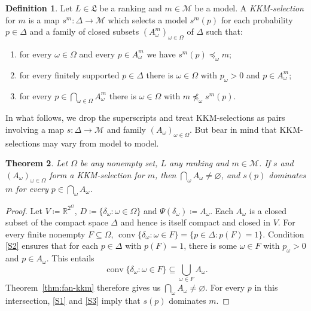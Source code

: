 \documentclass[11pt]{article}
\newcommand{\chg}[1]{{\color{red}#1}}
\newtheorem{theorem}{Theorem}[section]
\theoremstyle{definition}
\newtheorem{definition}[theorem]{Definition}
\theoremstyle{remark}
\newcommand{\M}{\mathcal M}
\begin{document}
\begin{definition}\label{def:selection}\label{def:selection-data}
Let $L\in\mathfrak L$ be a ranking and $m\in\M$ be a model. A \textit{KKM-selection} for $m$ is a map $s^m:\Delta\to\M$ which selects a model $s^m(p)$ for each probability $p\in\Delta$ and a family of closed subsets $(A^m_\omega)_{\omega\in\Omega}$ of $\Delta$ such that:
\begin{enumerate}[label=(S\arabic*),leftmargin=3em]
\item\label{S1} for every $\omega\in\Omega$ and every $p\in A^m_\omega$ we have $s^m(p)\preceq_\omega m$;
\item\label{S2} for every finitely supported $p\in\Delta$ there is $\omega\in\Omega$ with $p_\omega>0$ and $p\in A^m_\omega$;
\item\label{S3} for every $p\in\bigcap_{\omega\in\Omega}A^m_\omega$ there is $\omega\in\Omega$ with $m\not\preceq_\omega s^m(p)$.
\end{enumerate}
\end{definition}

In what follows, we drop the superscripts and treat KKM-selections as pairs involving a map $s:\Delta\to\M$ and family $(A_\omega)_{\omega\in\Omega}$. But bear in mind that KKM-selections may vary from model to model. 


\begin{theorem}\label{thm:selection}
Let $\Omega$ be any nonempty set, $L$ any ranking and $m\in\M$. If $s$ and $(A_\omega)_{\omega\in\Omega}$ form a KKM-selection for $m$, then $\bigcap_\omega A_\omega\ne\varnothing$, and $s(p)$ dominates $m$ for every $p\in\bigcap_\omega A_\omega$.
\end{theorem}
\begin{proof}
Let $V\coloneqq\mathbb R^{2^\Omega}$, $D\coloneqq\{\delta_\omega:\omega\in\Omega\}$ and $\Psi(\delta_\omega)\coloneqq A_\omega$. Each $A_\omega$ is a closed subset of the compact space $\Delta$ and hence is itself compact \chg{and closed in $V$}. For every finite nonempty $F\subseteq\Omega$, $\operatorname{conv}\{\delta_\omega:\omega\in F\}=\{p\in\Delta:p(F)=1\}$. Condition \ref{S2} ensures that for each $p\in\Delta$ with $p(F)=1$, there is some $\omega\in F$ with $p_\omega>0$ and $p\in A_\omega$. This entails
\[
\operatorname{conv}\{\delta_\omega:\omega\in F\}
\subseteq\bigcup_{\omega\in F}A_\omega.
\]
Theorem~\ref{thm:fan-kkm} therefore gives us $\bigcap_\omega A_\omega\ne\varnothing$. For every $p$ in this intersection, \ref{S1} and \ref{S3} imply that $s(p)$ dominates $m$.
\end{proof}
\end{document}
